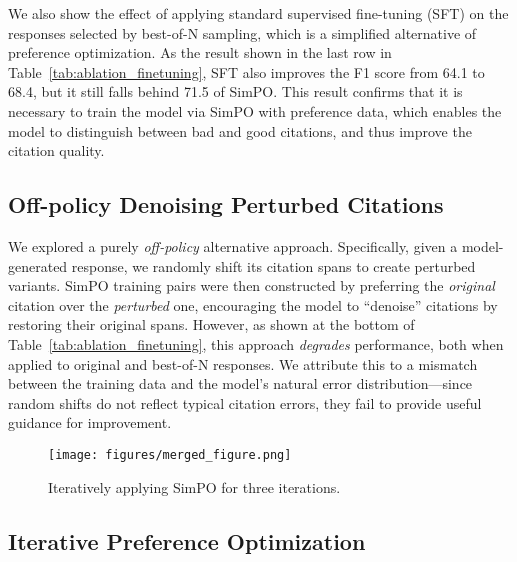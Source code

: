 We also show the effect of applying standard supervised fine-tuning (SFT) on the responses selected by best-of-N sampling, which is a simplified alternative of preference optimization. As the result shown in the last row in Table~\ref{tab:ablation_finetuning}, SFT also improves the F1 score from 64.1 to 68.4, but it still falls behind 71.5 of SimPO. This result confirms that it is necessary to train the model via SimPO with preference data, which enables the model to distinguish between bad and good citations, and thus improve the citation quality.

\subsection{Off-policy Denoising Perturbed Citations}
\label{sec:offpolicy}

We explored a purely \emph{off-policy} alternative approach. Specifically, given a model-generated response, we randomly shift its citation spans to create perturbed variants. SimPO training pairs were then constructed by preferring the \emph{original} citation over the \emph{perturbed} one, encouraging the model to ``denoise'' citations by restoring their original spans.
However, as shown at the bottom of Table~\ref{tab:ablation_finetuning}, this approach \emph{degrades} performance, both when applied to original and best-of-N responses. We attribute this to a mismatch between the training data and the model’s natural error distribution—since random shifts do not reflect typical citation errors, they fail to provide useful guidance for improvement.

\begin{figure}[t!]
\centering
\texttt{[image: figures/merged\_figure.png]}
\caption{Iteratively applying SimPO for three iterations.}
\label{fig:iter}
\end{figure}

\subsection{Iterative Preference Optimization}
\label{sec:iter}

